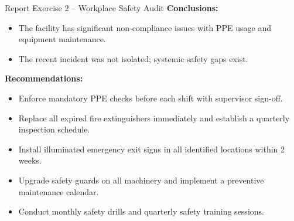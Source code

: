 \documentclass[12pt,a4paper]{article}
\begin{document}
\begin{exbox}{Report Exercise 2 -- Workplace Safety Audit}
\textbf{Conclusions:}
\begin{itemize}[noitemsep]
    \item The facility has significant non-compliance issues with PPE usage and equipment maintenance.
    \item The recent incident was not isolated; systemic safety gaps exist.
\end{itemize}

\textbf{Recommendations:}
\begin{itemize}[noitemsep]
    \item Enforce mandatory PPE checks before each shift with supervisor sign-off.
    \item Replace all expired fire extinguishers immediately and establish a quarterly inspection schedule.
    \item Install illuminated emergency exit signs in all identified locations within 2 weeks.
    \item Upgrade safety guards on all machinery and implement a preventive maintenance calendar.
    \item Conduct monthly safety drills and quarterly safety training sessions.
\end{itemize}
\end{exbox}
\end{document}
